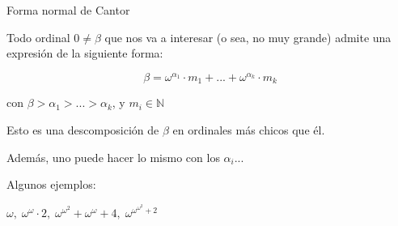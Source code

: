 \documentclass[10pt,spanish]{beamer}
\def\N{\mathbb{N}}
\begin{document}
\begin{frame}{Forma normal de Cantor}

Todo ordinal $0 \neq \beta$ que nos va a interesar (o sea, no muy grande) admite una expresión de la siguiente forma:

$$\beta = \omega^{\alpha_1} \cdot m_1 + ... + \omega^{\alpha_k} \cdot m_k$$

con $\beta > \alpha_1 > ... > \alpha_k$, y $m_i \in \N$

Esto es una descomposición de $\beta$ en ordinales más chicos que él. \bigskip \pause

Además, uno puede hacer lo mismo con los $\alpha_i$... \pause




Algunos ejemplos:

$\omega\textbf{,}\ \ \omega^\omega \cdot 2\textbf{,}\ \ \omega^{\omega^2} + \omega^\omega + 4\textbf{,}\ \ \omega^{\omega^{\omega^2} + 2}$


\end{frame}
\end{document}
